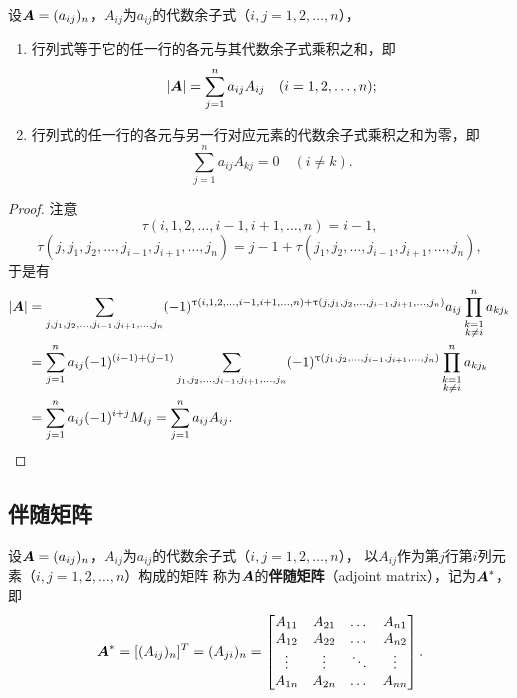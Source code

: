 \begin{theorem}
设\(\boldsymbol{A}=(a_{ij})_n\)，\(A_{ij}\)为\(a_{ij}\)的代数余子式（\(i,j=1,2,\dotsc,n\)），%
\begin{enumerate}
\item 行列式等于它的任一行的各元与其代数余子式乘积之和，即\[
\abs{\boldsymbol{A}}=\sum\limits_{j=1}^n a_{ij} A_{ij}
\quad(i=1,2,\dotsc,n);
\]

\item 行列式的任一行的各元与另一行对应元素的代数余子式乘积之和为零，即\[
\sum\limits_{j=1}^n a_{ij} A_{kj} = 0 \quad (i \neq k).
\]
\end{enumerate}
\begin{proof}
注意\[
\tau(i,1,2,\dotsc,i-1,i+1,\dotsc,n) = i-1,
\]\[
\tau(j,j_1,j_2,\dotsc,j_{i-1},j_{i+1},\dotsc,j_n) = j-1+\tau(j_1,j_2,\dotsc,j_{i-1},j_{i+1},\dotsc,j_n),
\]于是有\begin{align*}
\abs{\boldsymbol{A}}
&= \sum\limits_{j,j_1,j_2,\dotsc,j_{i-1},j_{i+1},\dotsc,j_n}
	(-1)^{\uptau(i,1,2,\dotsc,i-1,i+1,\dotsc,n) + \uptau(j,j_1,j_2,\dotsc,j_{i-1},j_{i+1},\dotsc,j_n)} a_{ij} \prod\limits_{\substack{k=1 \\ k \neq i}}^n a_{k j_k} \\
&= \sum\limits_{j=1}^n a_{ij} (-1)^{(i-1)+(j-1)}
	\sum\limits_{j_1,j_2,\dotsc,j_{i-1},j_{i+1},\dotsc,j_n}
		(-1)^{\uptau(j_1,j_2,\dotsc,j_{i-1},j_{i+1},\dotsc,j_n)}
			\prod\limits_{\substack{k=1 \\ k \neq i}}^n a_{k j_k} \\
&= \sum\limits_{j=1}^n a_{ij} (-1)^{i+j} M_{ij}
= \sum\limits_{j=1}^n a_{ij} A_{ij}.
\qedhere
\end{align*}
\end{proof}
\end{theorem}

\subsection{伴随矩阵}
\begin{definition}\label{definition:伴随矩阵.伴随矩阵的定义}
设\(\boldsymbol{A}=(a_{ij})_n\)，\(A_{ij}\)为\(a_{ij}\)的代数余子式（\(i,j=1,2,\dotsc,n\)），%
以\(A_{ij}\)作为第\(j\)行第\(i\)列元素（\(i,j=1,2,\dotsc,n\)）构成的矩阵%
称为\(\boldsymbol{A}\)的\textbf{伴随矩阵}（adjoint matrix），记为\(\boldsymbol{A}^*\)，即\[
\boldsymbol{A}^*
= [(A_{ij})_n]^T
= (A_{ji})_n
= \begin{bmatrix}
A_{11} & A_{21} & \dots & A_{n1} \\
A_{12} & A_{22} & \dots & A_{n2} \\
\vdots & \vdots & \ddots & \vdots \\
A_{1n} & A_{2n} & \dots & A_{nn}
\end{bmatrix}.
\]
\end{definition}

